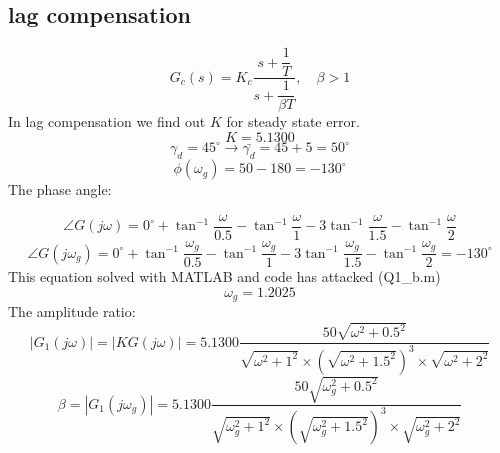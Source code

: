 \subsection{lag compensation}
$$
G_c(s) = K_c\dfrac{s + \dfrac{1}{T}}{s+\dfrac{1}{\beta T}}, \quad \beta > 1
$$
In lag compensation we find out $K$ for steady state error.
$$K = 5.1300$$
$$\gamma_d = 45^{\circ} \to \bar{\gamma_d} = 45 + 5 = 50^\circ$$
$$
\phi(\omega_g) = 50 - 180 = -130^{\circ}
$$
The phase angle:

$$
\angle G(j\omega) = 0^{\circ} + \tan^{-1}\dfrac{\omega}{0.5} - \tan^{-1}\dfrac{\omega}{1} - 3\tan^{-1}\dfrac{\omega}{1.5} - \tan^{-1}\dfrac{\omega}{2}
$$
$$
\angle G(j\omega_g) = 
0^{\circ} + \tan^{-1}\dfrac{\omega_g}{0.5} - \tan^{-1}\dfrac{\omega_g}{1} - 3\tan^{-1}\dfrac{\omega_g}{1.5} - \tan^{-1}\dfrac{\omega_g}{2} = -130^{\circ}
$$
This equation solved with MATLAB and code has attacked (Q1\_b.m)
$$
\omega_g =  1.2025
$$
The amplitude ratio:
$$
\left\vert G_1(j\omega) \right\vert = \left\vert KG(j\omega) \right\vert = 5.1300\dfrac{50\sqrt{\omega^2+0.5^2}}{\sqrt{\omega^2+1^2}\times(\sqrt{\omega^2 + 1.5^2})^3\times\sqrt{\omega^2 + 2^2}}
$$
$$
\beta = \left\vert G_1(j\omega_g) \right\vert = 
5.1300\dfrac{50\sqrt{\omega_g^2+0.5^2}}{\sqrt{\omega_g^2+1^2}\times(\sqrt{\omega_g^2 + 1.5^2})^3\times\sqrt{\omega_g^2 + 2^2}}
$$

